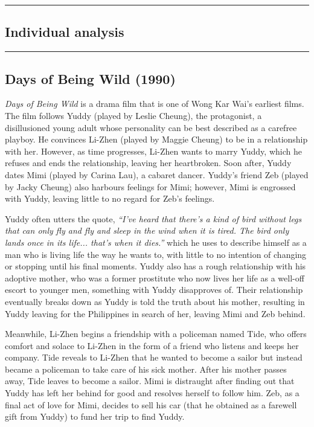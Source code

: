 \setlength{\headheight}{15pt}
{\color{gray}\hrule}
\begin{center}
\section{Individual analysis}
\end{center}
{\color{gray}\hrule}
\begin{multicols}{2}
\subsection{Days of Being Wild (1990)}
\emph{Days of Being Wild} is a drama film that is one of Wong Kar Wai's earliest films. The film follows Yuddy (played by Leslie Cheung), the protagonist, a disillusioned young adult whose personality can be best described as a carefree playboy. He convinces Li-Zhen (played by Maggie Cheung) to be in a relationship with her. However, as time progresses, Li-Zhen wants to marry Yuddy, which he refuses and ends the relationship, leaving her heartbroken. Soon after, Yuddy dates Mimi (played by Carina Lau), a cabaret dancer. Yuddy's friend Zeb (played by Jacky Cheung) also harbours feelings for Mimi; however, Mimi is engrossed with Yuddy, leaving little to no regard for Zeb’s feelings.

Yuddy often utters the quote, \emph{“I've heard that there's a kind of bird without legs that can only fly and fly and sleep in the wind when it is tired. The bird only lands once in its life... that's when it dies.”} which he uses to describe himself as a man who is living life the way he wants to, with little to no intention of changing or stopping until his final moments. Yuddy also has a rough relationship with his adoptive mother, who was a former prostitute who now lives her life as a well-off escort to younger men, something with Yuddy disapproves of. Their relationship eventually breaks down as Yuddy is told the truth about his mother, resulting in Yuddy leaving for the Philippines in search of her, leaving Mimi and Zeb behind.

Meanwhile, Li-Zhen begins a friendship with a policeman named Tide, who offers comfort and solace to Li-Zhen in the form of a friend who listens and keeps her company. Tide reveals to Li-Zhen that he wanted to become a sailor but instead became a policeman to take care of his sick mother. After his mother passes away, Tide leaves to become a sailor. Mimi is distraught after finding out that Yuddy has left her behind for good and resolves herself to follow him. Zeb, as a final act of love for Mimi, decides to sell his car (that he obtained as a farewell gift from Yuddy) to fund her trip to find Yuddy.


\end{multicols}
